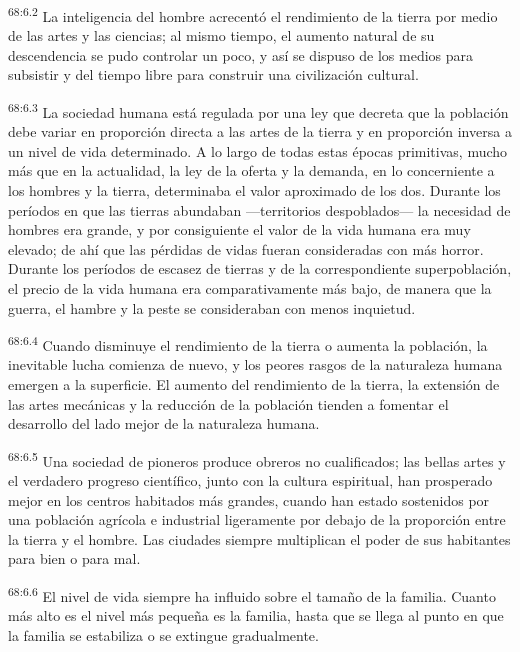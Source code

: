 \par
\textsuperscript{68:6.2} La inteligencia del hombre acrecentó el rendimiento de la tierra por medio de las artes y las ciencias; al mismo tiempo, el aumento natural de su descendencia se pudo controlar un poco, y así se dispuso de los medios para subsistir y del tiempo libre para construir una civilización cultural.

\par
\textsuperscript{68:6.3} La sociedad humana está regulada por una ley que decreta que la población debe variar en proporción directa a las artes de la tierra y en proporción inversa a un nivel de vida determinado. A lo largo de todas estas épocas primitivas, mucho más que en la actualidad, la ley de la oferta y la demanda, en lo concerniente a los hombres y la tierra, determinaba el valor aproximado de los dos. Durante los períodos en que las tierras abundaban ---territorios despoblados--- la necesidad de hombres era grande, y por consiguiente el valor de la vida humana era muy elevado; de ahí que las pérdidas de vidas fueran consideradas con más horror. Durante los períodos de escasez de tierras y de la correspondiente superpoblación, el precio de la vida humana era comparativamente más bajo, de manera que la guerra, el hambre y la peste se consideraban con menos inquietud.

\par
\textsuperscript{68:6.4} Cuando disminuye el rendimiento de la tierra o aumenta la población, la inevitable lucha comienza de nuevo, y los peores rasgos de la naturaleza humana emergen a la superficie. El aumento del rendimiento de la tierra, la extensión de las artes mecánicas y la reducción de la población tienden a fomentar el desarrollo del lado mejor de la naturaleza humana.

\par
\textsuperscript{68:6.5} Una sociedad de pioneros produce obreros no cualificados; las bellas artes y el verdadero progreso científico, junto con la cultura espiritual, han prosperado mejor en los centros habitados más grandes, cuando han estado sostenidos por una población agrícola e industrial ligeramente por debajo de la proporción entre la tierra y el hombre. Las ciudades siempre multiplican el poder de sus habitantes para bien o para mal.

\par
\textsuperscript{68:6.6} El nivel de vida siempre ha influido sobre el tamaño de la familia. Cuanto más alto es el nivel más pequeña es la familia, hasta que se llega al punto en que la familia se estabiliza o se extingue gradualmente.


